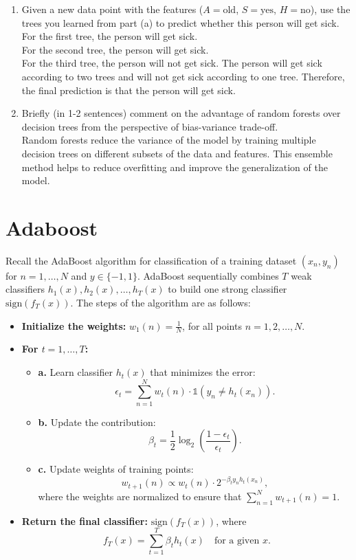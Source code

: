 \documentclass[a3paper,12pt]{extarticle} %
\begin{document}
\begin{enumerate}
        \item  Given a new data point with the features ($A = \text{old}$, $S = \text{yes}$, $H = \text{no}$), use the trees you learned from part (a) to predict whether this person will get sick.
        \\ For the first tree, the person will get sick.
        \\ For the second tree, the person will get sick.
        \\ For the third tree, the person will not get sick.
        The person will get sick according to two trees and will not get sick according to one tree. Therefore, the final prediction is that the person will get sick.
        \item  Briefly (in 1-2 sentences) comment on the advantage of random forests over decision trees from the perspective of bias-variance trade-off.
        \\ Random forests reduce the variance of the model by training multiple decision trees on different subsets of the data and features. This ensemble method helps to reduce overfitting and improve the generalization of the model.
    \end{enumerate}

\newpage
\section{Adaboost}
Recall the AdaBoost algorithm for classification of a training dataset $(x_n, y_n)$ for $n = 1, \dots, N$ and $y \in \{-1, 1\}$. AdaBoost sequentially combines $T$ weak classifiers $h_1(x), h_2(x), \dots, h_T(x)$ to build one strong classifier $\text{sign}(f_T(x))$. The steps of the algorithm are as follows:

\begin{itemize}
    \item \textbf{Initialize the weights:} $w_1(n) = \frac{1}{N}$, for all points $n = 1, 2, \dots, N$.
    \item \textbf{For $t = 1, \dots, T$:}
    \begin{itemize}
        \item \textbf{a.} Learn classifier $h_t(x)$ that minimizes the error:
        \[
        \epsilon_t = \sum_{n=1}^N w_t(n) \cdot \mathbb{1}(y_n \neq h_t(x_n)).
        \]
        \item \textbf{b.} Update the contribution:
        \[
        \beta_t = \frac{1}{2} \log_2\left(\frac{1 - \epsilon_t}{\epsilon_t}\right).
        \]
        \item \textbf{c.} Update weights of training points:
        \[
        w_{t+1}(n) \propto w_t(n) \cdot 2^{-\beta_t y_n h_t(x_n)},
        \]
        where the weights are normalized to ensure that $\sum_{n=1}^N w_{t+1}(n) = 1$.
    \end{itemize}
    \item \textbf{Return the final classifier:} $\text{sign}(f_T(x))$, where
    \[
    f_T(x) = \sum_{t=1}^T \beta_t h_t(x) \quad \text{for a given } x.
    \]
\end{itemize}
\end{document}
